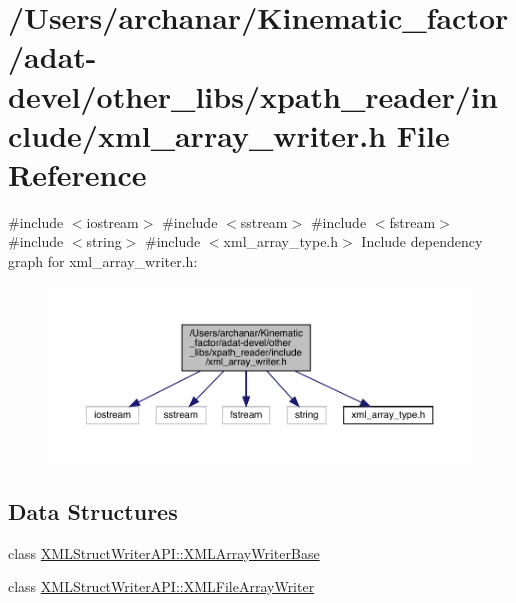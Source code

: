 \hypertarget{adat-devel_2other__libs_2xpath__reader_2include_2xml__array__writer_8h}{}\section{/\+Users/archanar/\+Kinematic\+\_\+factor/adat-\/devel/other\+\_\+libs/xpath\+\_\+reader/include/xml\+\_\+array\+\_\+writer.h File Reference}
\label{adat-devel_2other__libs_2xpath__reader_2include_2xml__array__writer_8h}
{\ttfamily \#include $<$iostream$>$}\newline
{\ttfamily \#include $<$sstream$>$}\newline
{\ttfamily \#include $<$fstream$>$}\newline
{\ttfamily \#include $<$string$>$}\newline
{\ttfamily \#include $<$xml\+\_\+array\+\_\+type.\+h$>$}\newline
Include dependency graph for xml\+\_\+array\+\_\+writer.\+h\+:
\nopagebreak
\begin{figure}[H]
\begin{center}
\leavevmode
\includegraphics[width=350pt]{d3/df0/adat-devel_2other__libs_2xpath__reader_2include_2xml__array__writer_8h__incl}
\end{center}
\end{figure}
\subsection*{Data Structures}
\begin{DoxyCompactItemize}
\item 
class \mbox{\hyperlink{classXMLStructWriterAPI_1_1XMLArrayWriterBase}{X\+M\+L\+Struct\+Writer\+A\+P\+I\+::\+X\+M\+L\+Array\+Writer\+Base}}
\item 
class \mbox{\hyperlink{classXMLStructWriterAPI_1_1XMLFileArrayWriter}{X\+M\+L\+Struct\+Writer\+A\+P\+I\+::\+X\+M\+L\+File\+Array\+Writer}}
\end{DoxyCompactItemize}
